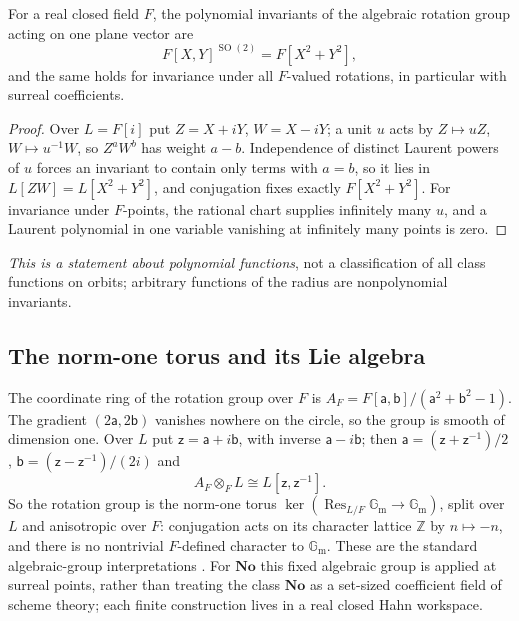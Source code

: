 \documentclass[11pt,letterpaper]{article}
\numberwithin{equation}{section}
\theoremstyle{definition}
\theoremstyle{remark}
\newcommand{\No}{\mathbf{No}}
\newcommand{\Z}{\mathbb Z}
\newcommand{\SO}{\operatorname{SO}}
\newcommand{\Gm}{\mathbb G_{\mathrm m}}
\begin{document}
\begin{proposition}\label{trigonometry:rot:prop:invariants}
For a real closed field $F$, the polynomial invariants of the algebraic rotation group acting on one
plane vector are
\begin{equation}\label{trigonometry:rot:eq:invariants}
 F[X,Y]^{\SO(2)}=F[X^2+Y^2],
\end{equation}
and the same holds for invariance under all $F$-valued rotations, in particular with surreal
coefficients.
\end{proposition}
\begin{proof}
Over $L=F[i]$ put $Z=X+iY$, $W=X-iY$; a unit $u$ acts by $Z\mapsto uZ$, $W\mapsto u^{-1}W$, so
$Z^aW^b$ has weight $a-b$. Independence of distinct Laurent powers of $u$ forces an invariant to
contain only terms with $a=b$, so it lies in $L[ZW]=L[X^2+Y^2]$, and conjugation fixes exactly
$F[X^2+Y^2]$. For invariance under $F$-points, the rational chart supplies infinitely many $u$, and a
Laurent polynomial in one variable vanishing at infinitely many points is zero.
\end{proof}
\emph{This is a statement about polynomial functions}, not a classification of all class functions
on orbits; arbitrary functions of the radius are nonpolynomial invariants.

\subsection{The norm-one torus and its Lie algebra}\label{trigonometry:rot:sec:lie}
The coordinate ring of the rotation group over $F$ is
$A_F=F[\mathsf a,\mathsf b]/(\mathsf a^2+\mathsf b^2-1)$. The gradient $(2\mathsf a,2\mathsf b)$
vanishes nowhere on the circle, so the group is smooth of dimension one. Over $L$ put
$\mathsf z=\mathsf a+i\mathsf b$, with inverse $\mathsf a-i\mathsf b$; then
$\mathsf a=(\mathsf z+\mathsf z^{-1})/2$, $\mathsf b=(\mathsf z-\mathsf z^{-1})/(2i)$ and
\begin{equation}\label{trigonometry:rot:eq:torussplit}
 A_F\otimes_FL\cong L[\mathsf z,\mathsf z^{-1}].
\end{equation}
So the rotation group is the norm-one torus $\ker(\operatorname{Res}_{L/F}\Gm\to\Gm)$, split over
$L$ and anisotropic over $F$: conjugation acts on its character lattice $\Z$ by $n\mapsto-n$, and
there is no nontrivial $F$-defined character to $\Gm$. These are the standard algebraic-group
interpretations \cite[Chapters 10 and 12]{Milne}. For $\No$ this fixed algebraic group is applied at
surreal points, rather than treating the class $\No$ as a set-sized coefficient field of scheme
theory; each finite construction lives in a real closed Hahn workspace.
\end{document}
